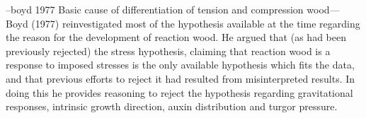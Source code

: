 --boyd 1977 Basic cause of differentiation of tension and
compression wood--- Boyd (1977) reinvestigated most of the hypothesis available at the time
regarding the reason for the development of reaction wood. He argued that (as
had been previously rejected) the stress hypothesis, claiming that reaction wood
is a response to imposed stresses is the only available hypothesis which fits
the data, and that previous efforts to reject it had resulted from
misinterpreted results. In doing this he provides reasoning to reject the
hypothesis regarding gravitational responses, intrinsic growth direction, auxin
distribution and turgor pressure.